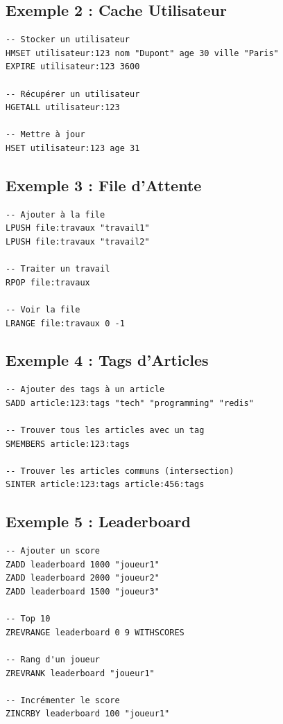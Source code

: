 \documentclass[11pt,a4paper]{article}
\begin{document}
\subsection{Exemple 2 : Cache Utilisateur}

\begin{lstlisting}
-- Stocker un utilisateur
HMSET utilisateur:123 nom "Dupont" age 30 ville "Paris"
EXPIRE utilisateur:123 3600

-- Récupérer un utilisateur
HGETALL utilisateur:123

-- Mettre à jour
HSET utilisateur:123 age 31
\end{lstlisting}

\subsection{Exemple 3 : File d'Attente}

\begin{lstlisting}
-- Ajouter à la file
LPUSH file:travaux "travail1"
LPUSH file:travaux "travail2"

-- Traiter un travail
RPOP file:travaux

-- Voir la file
LRANGE file:travaux 0 -1
\end{lstlisting}

\subsection{Exemple 4 : Tags d'Articles}

\begin{lstlisting}
-- Ajouter des tags à un article
SADD article:123:tags "tech" "programming" "redis"

-- Trouver tous les articles avec un tag
SMEMBERS article:123:tags

-- Trouver les articles communs (intersection)
SINTER article:123:tags article:456:tags
\end{lstlisting}

\subsection{Exemple 5 : Leaderboard}

\begin{lstlisting}
-- Ajouter un score
ZADD leaderboard 1000 "joueur1"
ZADD leaderboard 2000 "joueur2"
ZADD leaderboard 1500 "joueur3"

-- Top 10
ZREVRANGE leaderboard 0 9 WITHSCORES

-- Rang d'un joueur
ZREVRANK leaderboard "joueur1"

-- Incrémenter le score
ZINCRBY leaderboard 100 "joueur1"
\end{lstlisting}
\end{document}
